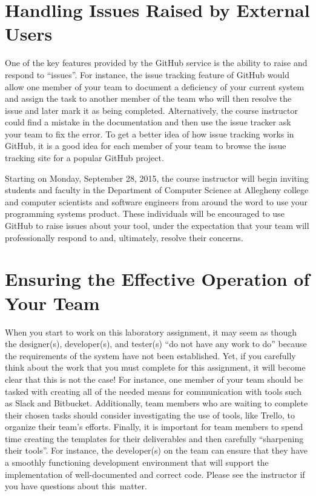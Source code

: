 \vspace*{-.05in}
\section*{Handling Issues Raised by External Users}

One of the key features provided by the GitHub service is the ability to raise and respond to ``issues''. For instance,
the issue tracking feature of GitHub would allow one member of your team to document a deficiency of your current system
and assign the task to another member of the team who will then resolve the issue and later mark it as being completed.
Alternatively, the course instructor could find a mistake in the documentation and then use the issue tracker ask your
team to fix the error. To get a better idea of how issue tracking works in GitHub, it is a good idea for each member of
your team to browse the issue tracking site for a popular GitHub project.

Starting on Monday, September 28, 2015, the course instructor will begin inviting students and faculty in the Department
of Computer Science at Allegheny college and computer scientists and software engineers from around the word to use your
programming systems product. These individuals will be encouraged to use GitHub to raise issues about your tool, under
the expectation that your team will professionally respond to and, ultimately, resolve their concerns.


\section*{Ensuring the Effective Operation of Your Team}

When you start to work on this laboratory assignment, it may seem as though the designer(s), developer(s), and tester(s)
``do not have any work to do'' because the requirements of the system have not been established. Yet, if you carefully
think about the work that you must complete for this assignment, it will become clear that this is not the case! For
instance, one member of your team should be tasked with creating all of the needed means for communication with tools
such as Slack and Bitbucket. Additionally, team members who are waiting to complete their chosen tasks should consider
investigating the use of tools, like Trello, to organize their team's efforts. Finally, it is important for team
members to spend time creating the templates for their deliverables and then carefully ``sharpening their tools''. For
instance, the developer(s) on the team can ensure that they have a smoothly functioning development environment that
will support the implementation of well-documented and correct code. Please see the instructor if you have questions
about \mbox{this matter}.

